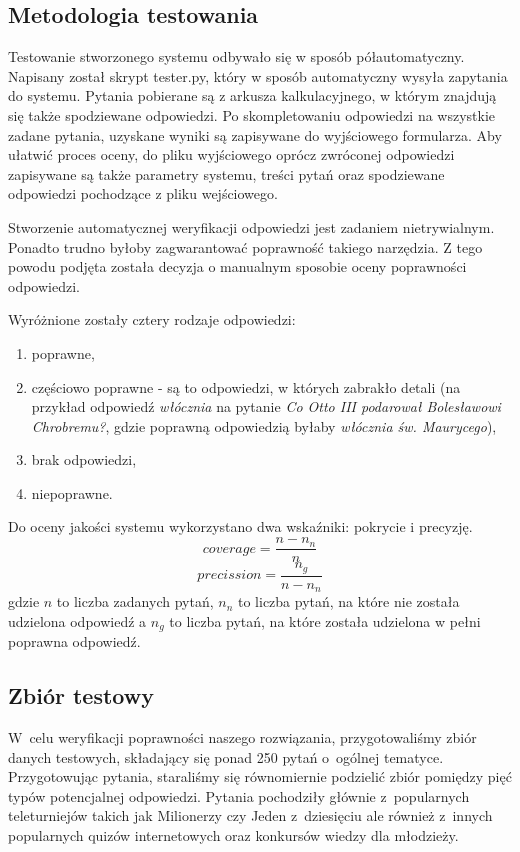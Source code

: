 \subsection{Metodologia testowania}
Testowanie stworzonego systemu odbywało się w sposób półautomatyczny. Napisany został skrypt tester.py, który w sposób automatyczny wysyła zapytania do systemu. Pytania pobierane są z arkusza kalkulacyjnego, w którym znajdują się także spodziewane odpowiedzi. Po skompletowaniu odpowiedzi na wszystkie zadane pytania,  uzyskane wyniki są zapisywane do wyjściowego formularza. Aby ułatwić proces oceny, do pliku wyjściowego oprócz zwróconej odpowiedzi zapisywane są także parametry systemu, treści pytań oraz spodziewane odpowiedzi pochodzące z pliku wejściowego.

Stworzenie automatycznej weryfikacji odpowiedzi jest zadaniem nietrywialnym. Ponadto trudno byłoby zagwarantować poprawność takiego narzędzia. Z tego powodu podjęta została decyzja o manualnym sposobie oceny poprawności odpowiedzi.

Wyróżnione zostały cztery rodzaje odpowiedzi:
\begin{enumerate}
	\item poprawne,
	\item częściowo poprawne - są to odpowiedzi, w których zabrakło detali (na przykład odpowiedź \textit{włócznia} na pytanie \textit{Co Otto III podarował Bolesławowi Chrobremu?}, gdzie poprawną odpowiedzią byłaby \textit{włócznia św. Maurycego}),
	\item brak odpowiedzi, 
	\item niepoprawne.
\end{enumerate}

Do oceny jakości systemu wykorzystano dwa wskaźniki: pokrycie i precyzję.
\begin{equation}
		coverage =  \frac{n - n_n}{n}
	\end{equation}
\begin{equation}
		precission = \frac{n_g}{n - n_n}
\end{equation}
gdzie $n$ to liczba zadanych pytań, $n_n$ to liczba pytań, na które nie została udzielona odpowiedź a $n_g$ to liczba pytań, na które została udzielona w pełni poprawna odpowiedź. 

\subsection{Zbiór testowy}
W~celu weryfikacji poprawności naszego rozwiązania, przygotowaliśmy zbiór danych testowych, składający się ponad 250 pytań o~ogólnej tematyce. Przygotowując pytania, staraliśmy się równomiernie podzielić zbiór pomiędzy pięć typów potencjalnej odpowiedzi. Pytania pochodziły głównie z~popularnych teleturniejów takich jak Milionerzy czy Jeden z~dziesięciu ale również z~innych popularnych quizów internetowych oraz konkursów wiedzy dla młodzieży.

